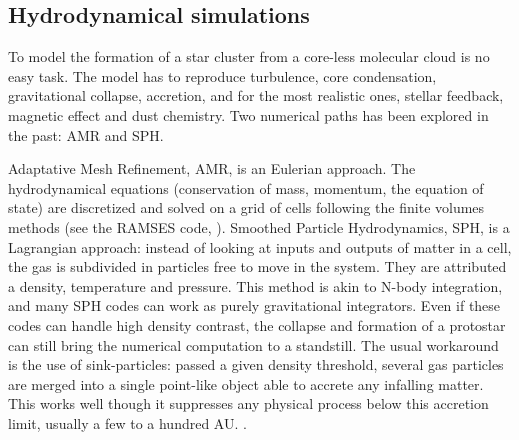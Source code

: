 \subsection{Hydrodynamical simulations}

To model the formation of a star cluster from a core-less molecular cloud is no easy task. The model has to reproduce turbulence, core condensation, gravitational collapse, accretion, and for the most realistic ones, stellar feedback, magnetic effect and dust chemistry. Two numerical paths has been explored in the past: AMR and SPH.

Adaptative Mesh Refinement, AMR, is an Eulerian approach. The hydrodynamical equations (conservation of mass, momentum, the equation of state) are discretized and solved on a grid of cells following the finite volumes methods (see the RAMSES code, \citealt{Teyssier2002}). Smoothed Particle Hydrodynamics, SPH, is a Lagrangian approach: instead of looking at inputs and outputs of matter in a cell, the gas is subdivided in particles free to move in the system. They are attributed a density, temperature and pressure. This method is akin to N-body integration, and many SPH codes can work as purely gravitational integrators. Even if these codes can handle high density contrast, the collapse and formation of a protostar can still bring the numerical computation to a standstill. The usual workaround is the use of sink-particles: passed a given density threshold, several gas particles are merged into a single point-like object able to accrete any infalling matter. This works well though it suppresses any physical process below this accretion limit, usually a few to a hundred AU. \citep{Bate1997}.




